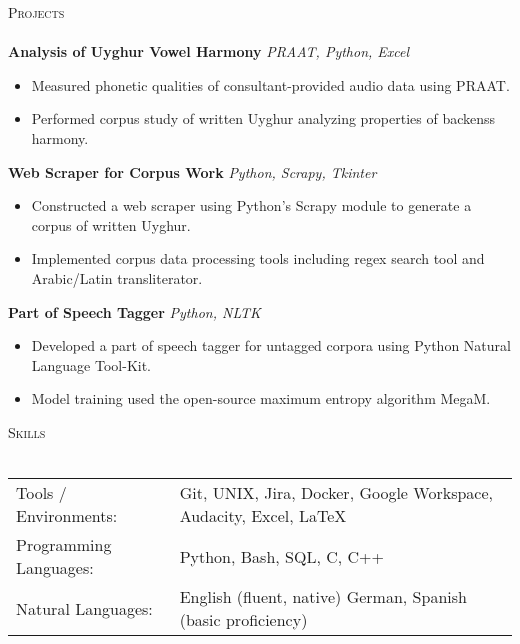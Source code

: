 \documentclass[]{article}
\newcommand{\lineunder} {
	\vspace*{-8pt} \\
	\hspace*{-18pt} \hrulefill \\
}
\newcommand{\header} [1] {
	{\hspace*{-18pt}\vspace*{6pt} \textsc{#1}}
	\vspace*{-6pt} \lineunder
}
\begin{document}
	\header{Projects}
	{\textbf{Analysis of Uyghur Vowel Harmony}} \hspace*{5mm} {\sl PRAAT, Python, Excel}
	\vspace*{-5pt}\begin{itemize}	\itemsep 0pt 
		\item Measured phonetic qualities of consultant-provided audio data using PRAAT.
		\item Performed corpus study of written Uyghur analyzing properties of backenss harmony.
	\end{itemize}
	\vspace*{0mm}
	
	{\textbf{Web Scraper for Corpus Work}} \hspace*{5mm} {\sl Python, Scrapy, Tkinter}
	\vspace*{-5pt}\begin{itemize}	\itemsep 0pt 
		\item Constructed a web scraper using Python's Scrapy module to generate a corpus of written Uyghur.
		\item Implemented corpus data processing tools including regex search tool and Arabic/Latin transliterator.
	\end{itemize}
	\vspace*{0mm}
	
	{\textbf{Part of Speech Tagger}} \hspace*{5mm} {\sl Python, NLTK} \\
	\vspace*{-5pt}\begin{itemize}	\itemsep 0pt
		\item Developed a part of speech tagger for untagged corpora using Python Natural Language Tool-Kit.
		\item Model training used the open-source maximum entropy algorithm MegaM.
	\end{itemize}
	\vspace*{0mm}
	
	\header{Skills}
	\begin{tabular}{ l p{11.2cm} }
		Tools / Environments:  & Git, UNIX, Jira, Docker, Google Workspace, Audacity, Excel, \LaTeX
		\\
		Programming Languages: & Python, Bash, SQL, C, C++
		\\
		Natural Languages:     & English \hfill (fluent, native) \newline German, Spanish \hfill (basic proficiency)
		\\
	\end{tabular}
	\vspace{2mm}
	
\end{document}
